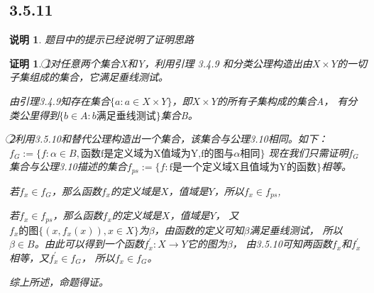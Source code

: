 \documentclass{article}
\theoremstyle{mystyle}
\newtheorem*{zremark}{说明}
\theoremstyle{zproofstyle}
\newtheorem*{zproof}{证明}
\begin{document}
\subsection*{3.5.11}
\begin{zgraytheorem}
  \begin{zremark}
    题目中的提示已经说明了证明思路
  \end{zremark}
\end{zgraytheorem}

\begin{zproof}
  \textcircled{1}对任意两个集合X和Y，利用引理 3.4.9 和分类公理构造出由$X \times Y$的一切子集组成的集合，它满足垂线测试。

  由引理3.4.9知存在集合$\{a : a \in X \times Y\}$，即$X\times Y$的所有子集构成的集合A，
  有分类公里得到$\{b \in A : b\text{满足垂线测试} \}$集合B。

  \textcircled{2}利用3.5.10和替代公理构造出一个集合，该集合与公理3.10相同。如下：
  \newline
  $f_G := \{f: \alpha \in B, \text{函数f是定义域为X值域为Y,f的图与}\alpha \text{相同}\}$
  \newline
  现在我们只需证明$f_G$集合与公理3.10描述的集合$f_{ps} := \{ f: \text{f是一个定义域X且值域为Y的函数}\}$相等。

  若$f_x \in f_G$，那么函数$f_x$的定义域是$X$，值域是$Y$，所以$f_x \in f_{ps}$,

  若$f_x \in f_{ps}$，那么函数$f_x$的定义域是$X$，值域是$Y$，
  又$f_x \text{的图}\{(x, f_x(x)), x \in X\}$为$\beta$，由函数的定义可知$\beta$满足垂线测试，
  所以$\beta \in B$。由此可以得到一个函数$f_x^\prime: X \rightarrow Y$它的图为$\beta$，
  由3.5.10可知两函数$f_x$和$f_x^\prime$相等，又$f_x^\prime \in f_G$，
  所以$f_x \in f_G$。

  综上所述，命题得证。
\end{zproof}
\end{document}

